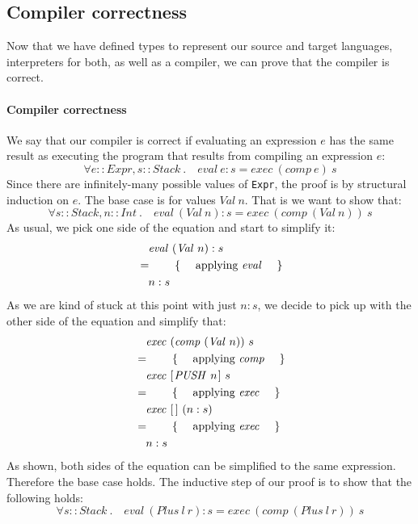 \subsection{Compiler correctness}

Now that we have defined types to represent our source and target languages, interpreters for both, as well as a compiler, we can prove that the compiler is correct.

\paragraph{Compiler correctness} We say that our compiler is correct if evaluating an expression $e$ has the same result as executing the program that results from compiling an expression $e$:
\begin{displaymath}
\forall e :: \mathit{Expr}, s :: \mathit{Stack} ~.\quad \mathit{eval}~e : s = \mathit{exec}~(\mathit{comp}~e)~s
\end{displaymath}
Since there are infinitely-many possible values of \texttt{\small Expr}, the proof is by structural induction on $e$. The base case is for values $\mathit{Val}~n$. That is we want to show that:
\begin{displaymath}
\forall s :: \mathit{Stack}, n :: \mathit{Int} ~.\quad \mathit{eval}~(\mathit{Val}~n) : s = \mathit{exec}~(\mathit{comp}~(\mathit{Val}~n))~s
\end{displaymath}
As usual, we pick one side of the equation and start to simplify it:
\begin{align*}
&\quad \mathit{eval}~(\mathit{Val}~n) : s\\
&=\qquad\text{\{\quad\ applying $\mathit{eval}$ \quad\}}\\
&\quad n : s
\end{align*}
As we are kind of stuck at this point with just $n:s$, we decide to pick up with the other side of the equation and simplify that: 
\begin{align*}
\expr{\mathit{exec}~(\mathit{comp}~(\mathit{Val}~n))~s}
\hint{applying $\mathit{comp}$}
\expr{\mathit{exec}~\hslist{\mathit{PUSH}~n}~s}
\hint{applying $\mathit{exec}$}
\expr{\mathit{exec}~\hslist{}~(n:s)}
\hint{applying $\mathit{exec}$}
\lastexpr{n : s}
\end{align*}
As shown, both sides of the equation can be simplified to the same expression. Therefore the base case holds. The inductive step of our proof is to show that the following holds:
\begin{displaymath}
\forall s :: \mathit{Stack}~.\quad \mathit{eval}~(\mathit{Plus}~l~r) : s = \mathit{exec}~(\mathit{comp}~(\mathit{Plus}~l~r))~s
\end{displaymath}
